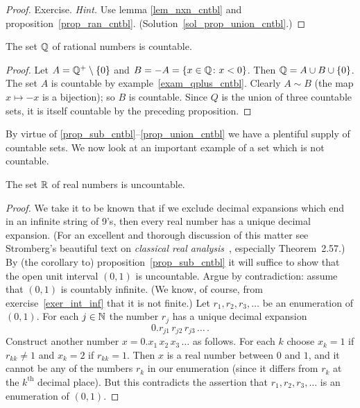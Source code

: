 \begin{proof} Exercise. \emph{Hint.}  Use lemma \ref{lem_nxn_cntbl} and
proposition~\ref{prop_ran_cntbl}.   (Solution~\ref{sol_prop_union_cntbl}.) \ns
\end{proof}

\begin{exam}  The set $\mathbb{Q}$ of rational numbers is countable.
\end{exam}

\begin{proof} Let $A = \mathbb{Q}^+\setminus\{0\}$ and $B = -A = \{x \in \mathbb{Q} \colon x < 0\}$. Then $\mathbb{Q}
= A \cup B \cup \{0\}$.  The set $A$ is countable by example~\ref{exam_qplus_cntbl}.  Clearly
$A \sim B$  (the map $x \mapsto -x$ is a bijection); so $B$ is countable. Since $Q$ is the
union of three countable sets, it is itself countable by the preceding proposition.
\end{proof}

By virtue of \ref{prop_sub_cntbl}--\ref{prop_union_cntbl} we have a plentiful supply of
countable sets. We now look at an important example of a set which is not countable.

\begin{exam}\label{exam_r_uncntbl}  The set $\mathbb{R}$ of real numbers is uncountable.
\end{exam}

\begin{proof} We take it to be known that if we exclude decimal expansions which end in an
infinite string of 9's, then every real number has a unique decimal expansion. (For an
excellent and thorough discussion of this matter see Stromberg's beautiful text on
\emph{classical real analysis}~\cite{Stromberg:1981}, especially Theorem~2.57.)  By (the
corollary to) proposition~\ref{prop_sub_cntbl} it will suffice to show that the open unit
interval $(0,1)$ is uncountable. Argue by contradiction: assume that $(0,1)$ is countably
infinite. (We know, of course, from exercise~\ref{exer_int_inf} that it is not finite.) Let
$r_1, r_2, r_3, \dots$ be an enumeration of $(0,1)$. For each $j \in \mathbb{N}$ the number $r_j$ has
a unique decimal expansion
  \[ 0.r_{j1}\,r_{j2}\,r_{j3}\,\dots\,. \]
Construct another number $x = 0.x_1\,x_2\,x_3\,\dots$ as follows. For each $k$ choose $x_k= 1$
if $r_{kk} \ne 1$ and $x_k = 2$ if $r_{kk} = 1$. Then $x$ is a real number between $0$ and
$1$, and it cannot be any of the numbers $r_k$ in our enumeration (since it differs from $r_k$
at the $k^{\text{th}}$ decimal place). But this contradicts the assertion that $r_1, r_2, r_3,
\dots$ is an enumeration of $(0,1)$.
\end{proof}

